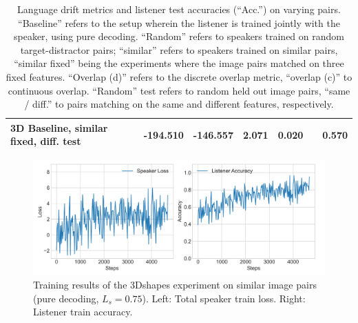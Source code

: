 \begin{table}[]
\begin{tabularx}{\textwidth}{|X|l|l|X|X|X|X|}
		3D Baseline, similar fixed, diff. test &     -194.510     &    -146.557          &   2.071      & 0.020    &                &              0.570          \\ \hline
	\end{tabularx}
	\caption{\label{tab:3dshapes_drift_metrics_basic_similar} Language drift metrics and listener test accuracies (``Acc.'') on varying pairs. 
		``Baseline'' refers to the setup wherein the listener is trained jointly with the speaker, using pure decoding. ``Random'' refers to speakers trained on random target-distractor pairs; ``similar'' refers to speakers trained on similar pairs, ``similar fixed'' being the experiments where the image pairs matched on three fixed features. ``Overlap (d)'' refers to the discrete overlap metric, ``overlap (c)'' to continuous overlap. ``Random'' test refers to random held out image pairs, ``same / diff.'' to pairs matching on the same and different features, respectively.}
\end{table}

\begin{figure}[h]
	\centering
	\includegraphics[width=\linewidth]{images/3dshapes_refgame_49_pure_075_similar.png}
	\caption{Training results of the 3Dshapes experiment on similar image pairs (pure decoding, $L_s = 0.75$). Left: Total speaker train loss. Right: Listener train accuracy.}
	\label{fig:3dshapes_similar_075_speaker_loss_listener_acc}
\end{figure}

